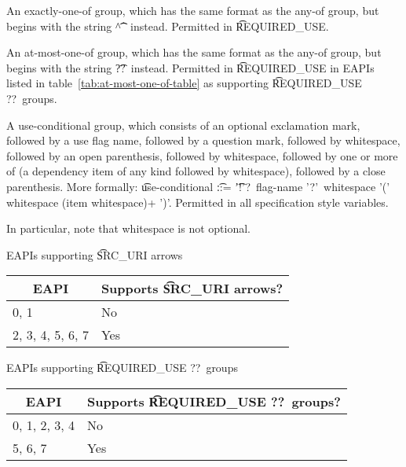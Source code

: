 \begin{compactitem}
\item An exactly-one-of group, which has the same format as the any-of group, but begins with the
    string \t{\textasciicircum\textasciicircum} instead. Permitted in \t{REQUIRED_USE}.
\item {} An at-most-one-of group, which has the same format as the
    any-of group, but begins with the string \t{??}\ instead. Permitted in \t{REQUIRED_USE} in
    EAPIs listed in table~\ref{tab:at-most-one-of-table} as supporting \t{REQUIRED_USE ??}\ groups.
\item A use-conditional group, which consists of an optional exclamation mark, followed by
    a use flag name, followed by a question mark, followed by whitespace, followed by
    an open parenthesis, followed by whitespace, followed by one or more of (a dependency item
    of any kind followed by whitespace), followed by a close parenthesis. More formally:
    \t{use-conditional} \t{::=} \t{'!'?\ flag-name '?'\ whitespace '(' whitespace (item
    whitespace)+ ')'}.
    Permitted in all specification style variables.
\end{compactitem}

In particular, note that whitespace is not optional.

\begin{centertable}{EAPIs supporting \t{SRC_URI} arrows}
    \label{tab:uri-arrows-table}
    \begin{tabular}{ll}
      \toprule
      \multicolumn{1}{c}{\textbf{EAPI}} &
      \multicolumn{1}{c}{\textbf{Supports \t{SRC_URI} arrows?}} \\
      \midrule
      0, 1              & No  \\
      2, 3, 4, 5, 6, 7  & Yes \\
      \bottomrule
    \end{tabular}
\end{centertable}

\begin{centertable}{EAPIs supporting \t{REQUIRED_USE ??}\ groups}
    \label{tab:at-most-one-of-table}
    \begin{tabular}{ll}
      \toprule
      \multicolumn{1}{c}{\textbf{EAPI}} &
      \multicolumn{1}{c}{\textbf{Supports \t{REQUIRED_USE ??}\ groups?}} \\
      \midrule
      0, 1, 2, 3, 4     & No  \\
      5, 6, 7           & Yes \\
      \bottomrule
    \end{tabular}
\end{centertable}


